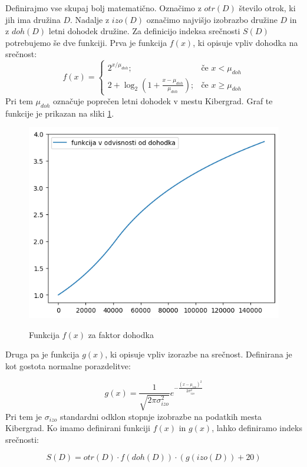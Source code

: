 \documentclass{article}
\begin{document}
Definirajmo vse skupaj bolj matematično. Označimo z $otr(D)$ število otrok, ki jih ima družina $D$. Nadalje z $izo(D)$ označimo najvišjo izobrazbo družine $D$ in z $doh(D)$ letni 
dohodek družine. Za definicijo indeksa srečnosti $S(D)$ potrebujemo še dve funkciji. Prva je funkcija $f(x)$, ki opisuje vpliv dohodka na srečnost:
$$
f(x) =
\begin{cases}
    2^{x/\mu_{doh}}; & \text{če } x < \mu_{doh} \\
    2 + \log_2 (1 + \frac{x - \mu_{doh}}{\mu_{doh}}); & \text{če } x \geq \mu_{doh}
\end{cases}
$$ 
Pri tem $\mu_{doh}$ označuje poprečen letni dohodek v mestu Kibergrad. Graf te funkcije je prikazan na sliki \ref{fig:slika3}.

\begin{figure}[H]
    \caption{Funkcija $f(x)$ za faktor dohodka}
    \centering
    \includegraphics[scale=0.6]{funkcija_v_odvisnosti_od_dohodka.png}
    \label{fig:slika3}
\end{figure}

Druga pa je funkcija $g(x)$, ki opisuje vpliv izorazbe na srečnost. Definirana je kot gostota normalne porazdelitve:

$$
g(x) = \frac{1}{\sqrt{2 \pi \sigma_{izo}^2}} e^{-\frac{(x-\mu_{izo})^2}{2 \sigma_{izo}^2}}
$$
Pri tem je $\sigma_{izo}$ standardni odklon stopnje izobrazbe na podatkih mesta Kibergrad. Ko imamo definirani funkciji $f(x)$ in $g(x)$,
lahko definiramo indeks srečnosti:

$$
S(D) = otr(D) \cdot f(doh(D)) \cdot (g(izo(D)) + 20)
$$
\end{document}
